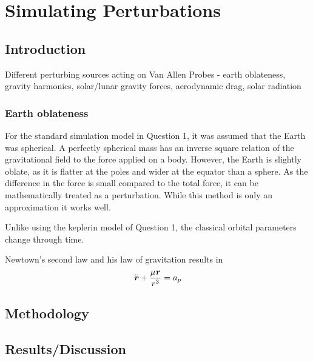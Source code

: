 \documentclass[Space3_Assign1.tex]{subfiles}
\begin{document}
\section{Simulating Perturbations}

\subsection{Introduction}
Different perturbing sources acting on Van Allen Probes - earth oblateness, gravity harmonics, solar/lunar gravity forces, aerodynamic drag, solar radiation\\

\subsubsection{Earth oblateness}
For the standard simulation model in Question 1, it was assumed that the Earth was spherical. A perfectly spherical mass has an inverse square relation of the gravitational field to the force applied on a body. However, the Earth is slightly oblate, as it is flatter at the poles and wider at the equator than a sphere. As the difference in the force is small compared to the total force, it can be mathematically treated as a perturbation. While this method is only an approximation it works well.

Unlike using the keplerin model of Question 1, the classical orbital parameters change through time.


Newtown's second law and his law of gravitation results in 
\begin{eqnarray}
\ddot{\textbf{\textit{r}}}+\frac{\mu\textbf{\textit{r}}}{r^3} = a_p
\end{eqnarray}

\subsection{Methodology}




\subsection{Results/Discussion}
\end{document}
